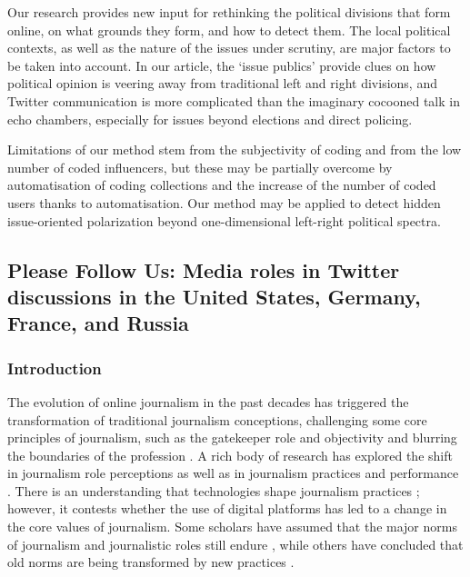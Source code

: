 Our research provides new input for rethinking the political divisions that form online, on what grounds they form, and how to detect them. The local political contexts, as well as the nature of the issues under scrutiny, are major factors to be taken into account. In our article, the ‘issue publics’ provide clues on how political opinion is veering away from traditional left and right divisions, and Twitter communication is more complicated than the imaginary cocooned talk in echo chambers, especially for issues beyond elections and direct policing.

Limitations of our method stem from the subjectivity of coding and from the low number of coded influencers, but these may be partially overcome by automatisation of coding collections and the increase of the number of coded users thanks to automatisation. Our method may be applied to detect hidden issue-oriented polarization beyond one-dimensional left-right political spectra.

\subsection{Please Follow Us: Media roles in Twitter discussions in the United States, Germany, France, and Russia}\label{subsec:ch5/sec1/sub2}

\subsubsection{Introduction}

The evolution of online journalism in the past decades has triggered the transformation of traditional journalism conceptions, challenging some core principles of journalism, such as the gatekeeper role and objectivity \cite{SchudsonAnderson} and blurring the boundaries of the profession \cite{Franklin}. A rich body of research has explored the shift in journalism role perceptions \cite{SchudsonAnderson,Hermida,Waisbord,WeaverWillnat} as well as in journalism practices and performance \cite{Pavlik,LasorsaLewisHolton,Vis}. There is an understanding that technologies shape journalism practices \cite{Pavlik,Mellado}; however, it contests whether the use of digital platforms has led to a change in the core values of journalism. Some scholars have assumed that the major norms of journalism and journalistic roles still endure \cite{Fenton,Waisbord,AlRawi}, while others have concluded that old norms are being transformed by new practices \cite{Gillmor,Reese,LindnerConnellMeyer}.

